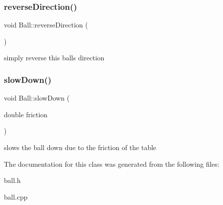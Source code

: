 \subsubsection{\texorpdfstring{reverse\+Direction()}{reverseDirection()}}
{\footnotesize\ttfamily void Ball\+::reverse\+Direction (\begin{DoxyParamCaption}{ }\end{DoxyParamCaption})}

simply reverse this ball\textquotesingle{}s direction \mbox{\label{class_ball_a1557e7212e496a96aab9ca9a683dfca2}} 
\subsubsection{\texorpdfstring{slow\+Down()}{slowDown()}}
{\footnotesize\ttfamily void Ball\+::slow\+Down (\begin{DoxyParamCaption}\item[{double}]{friction }\end{DoxyParamCaption})}

slows the ball down due to the friction of the table 

The documentation for this class was generated from the following files\+:\begin{DoxyCompactItemize}
\item 
ball.\+h\item 
ball.\+cpp\end{DoxyCompactItemize}
